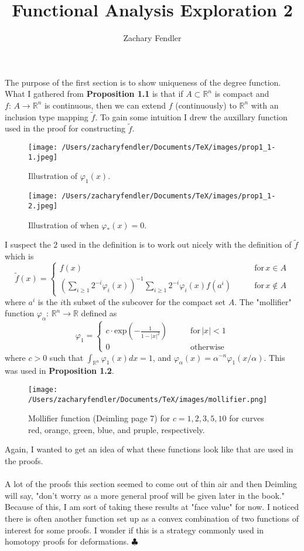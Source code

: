 \documentclass[reqno, 12pt]{article}
\title{Functional Analysis Exploration 2}
\author{Zachary Fendler}
\newcommand{\R}{\mathbb{R}}
\newcommand{\END}{\hspace*{\fill} $\clubsuit$}
\begin{document}
\maketitle
The purpose of the first section is to show uniqueness of the degree function. What I gathered from \textbf{Proposition 1.1} is that if $A \subset \R^n$ is compact and $f: \, A \rightarrow \R^n$ is continuous, then we can extend $f$ (continuously) to $\R^n$ with an inclusion type mapping $\tilde{f}$. To gain some intuition I drew the auxillary function used in the proof for constructing $\tilde{f}$.
\begin{figure}[h]
	\centering
	\texttt{[image: /Users/zacharyfendler/Documents/TeX/images/prop1\_1-1.jpeg]}
	\caption{Illustration of $\varphi_1(x)$.}
\end{figure}
\begin{figure}[h]
	\centering
	\texttt{[image: /Users/zacharyfendler/Documents/TeX/images/prop1\_1-2.jpeg]}
	\caption{Illustration of when $\varphi_*(x)=0$.}
\end{figure}
I suspect the $2$ used in the definition is to work out nicely with the definition of $\tilde{f}$ which is
$$\tilde{f}(x) = \begin{cases}
f(x) \qquad &\text{for}\, x \in A \\
\left(\sum_{i\geq 1}2^{-i}\varphi_i(x)\right)^{-1} \sum_{i \geq 1}2^{-i}\varphi_i(x) f(a^i) \qquad &\text{for} \, x \notin A
\end{cases}$$
where $a^i$ is the $i$th subset of the subcover for the compact set $A$. 
The "mollifier" function $\varphi_\alpha : \, \R^n \rightarrow \R$ defined as 
$$\varphi_1 = \begin{cases}
	c\cdot \text{exp}\left(-\frac{1}{1- |x|^2}\right) \qquad &\text{for} \, |x| < 1 \\
	0 \qquad &\text{otherwise}
\end{cases}$$
where $c > 0$ such that $\int_{\R^n}\varphi_1(x) dx = 1$, and $\varphi_\alpha(x) = \alpha^{-n}\varphi_1(x/\alpha)$. This was used in \textbf{Proposition 1.2}.
\begin{figure}
\centering
\texttt{[image: /Users/zacharyfendler/Documents/TeX/images/mollifier.png]}
\caption{Mollifier function (Deimling page 7) for $c = 1,2,3,5,10$ for curves red, orange, green, blue, and pruple, respectively.}
\end{figure}
Again, I wanted to get an idea of what these functions look like that are used in the proofs. 
\\\\A lot of the proofs this section seemed to come out of thin air and then Deimling will say, "don't worry as a more general proof will be given later in the book." Because of this, I am sort of taking these results at "face value" for now. I noticed there is often another function set up as a convex combination of two functions of interest for some proofs. I wonder if this is a strategy commonly used in homotopy proofs for deformations. \END
\end{document}
